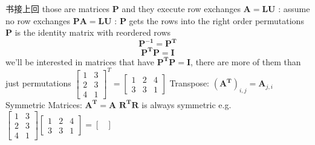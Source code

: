\documentclass[12pt, a4paper]{article}
\begin{document}
{\noindent 书接上回 \quad those are matrices ${\mathbf{P}}$ and they execute row exchanges
\vspace{14pt}
\newline
${\mathbf{A = LU}}$ \quad : assume no row exchanges
\newline
${\mathbf{PA = LU}}$ \quad : ${\mathbf{P}}$ gets the rows into the right order
\vspace{14pt}
\newline
permutations ${\mathbf{P}}$ is the identity matrix with reordered rows
\begin{displaymath}
	{\mathbf{P^{-1}}} = {\mathbf{P^{T}}}
\end{displaymath}
\begin{displaymath}
	{\mathbf{P^{T}}}{\mathbf{P}} = {\mathbf{I}}
\end{displaymath}
we'll be interested in matrices that have ${\mathbf{P^{T}}}{\mathbf{P}} = {\mathbf{I}}$, {\textcolor{anhao-scarlet}{there are more of them than just permutations}}
\vspace{14pt}
\newline
\begin{math}
	\begin{bmatrix}
		1 & 3 \\
		2 & 3 \\
		4 & 1 
	\end{bmatrix}^{T}
	 = 
	\begin{bmatrix}
		1 & 2 & 4 \\
		3 & 3 & 1 
	\end{bmatrix}
\end{math}
\vspace{14pt}
\newline
Transpose: $\left({\mathbf{A^{T}}}\right)_{i,j} = {\mathbf{A}}_{j,i}$
\newline
Symmetric Matrices: ${\mathbf{A^{T}}} = {\mathbf{A}}$
\vspace{14pt}
\newline
${\mathbf{R^TR}}$ is always symmetric
\newline
e.g.
\begin{math}
	\begin{bmatrix}
		1 & 3 \\
		2 & 3 \\
		4 & 1
	\end{bmatrix}
	\begin{bmatrix}
		1 & 2 & 4 \\
		3 & 3 & 1 
	\end{bmatrix}
	 = 
	\begin{bmatrix}

\end{bmatrix}
\end{math}}
\end{document}
